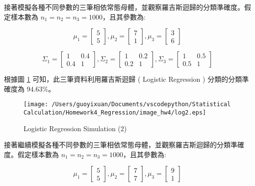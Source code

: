 接著模擬各種不同參數的三筆相依常態母體，並觀察羅吉斯迴歸的分類準確度。假定樣本數為 $n_1=n_2=n_3=1000$，且其參數為:

$$ \mu_1 = \left[
            \begin{array}{clr}
                5  \\
                5 
            \end{array} \right] ,
            \mu_2 = \left[
            \begin{array}{clr}
                7  \\
                1 
            \end{array} \right] ,
            \mu_3 = \left[
            \begin{array}{clr}
                3  \\
                6 
            \end{array} \right] $$ 
            
$$ \Sigma_1 = \left[
            \begin{array}{clr}
                1 & 0.4  \\
                0.4 & 1
            \end{array} \right] ,
            \Sigma_2 = \left[
            \begin{array}{clr}
                1 & 0.2  \\
                0.2 & 1 
            \end{array} \right] ,
            \Sigma_3 = \left[
            \begin{array}{clr}
                1 & 0.5  \\
                0.5 & 1 
            \end{array} \right] $$       

根據圖 \ref{fig:log2} 可知，此三筆資料利用羅吉斯迴歸 ( Logistic Regression ) 分類的分類準確度為 $94.63\%$。 
            
\begin{figure}[H]
    \centering
        \texttt{[image: /Users/guoyixuan/Documents/vscodepython/Statistical Calculation/Homework4\_Regression/image\_hw4/log2.eps]}
    \caption{Logistic Regression Simulation (2)}
    \label{fig:log2}
\end{figure}

接著繼續模擬各種不同參數的三筆相依常態母體，並觀察羅吉斯迴歸的分類準確度。假定樣本數為 $n_1=n_2=n_3=1000$，且其參數為:

$$ \mu_1 = \left[
            \begin{array}{clr}
                5  \\
                5 
            \end{array} \right] ,
            \mu_2 = \left[
            \begin{array}{clr}
                7  \\
                7 
            \end{array} \right] ,
            \mu_3 = \left[
            \begin{array}{clr}
                9  \\
                1 
            \end{array} \right] $$ 
            
